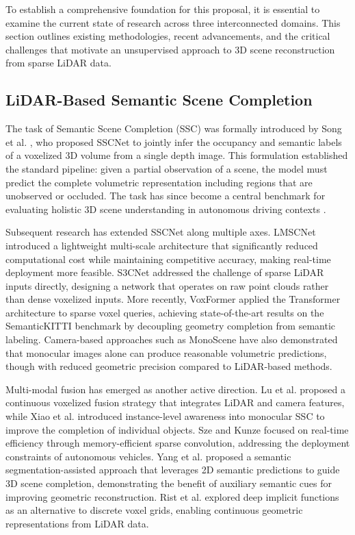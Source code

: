 \documentclass[a4paper, 12pt]{article}
\begin{document}
	To establish a comprehensive foundation for this proposal, it is essential to
	examine the current state of research across three interconnected domains. This
	section outlines existing methodologies, recent advancements, and the critical
	challenges that motivate an unsupervised approach to 3D scene reconstruction
	from sparse LiDAR data.
	
	\subsection{LiDAR-Based Semantic Scene Completion}
	
	The task of Semantic Scene Completion (SSC) was formally introduced by Song et
	al. \cite{Song_2017_CVPR}, who proposed SSCNet to jointly infer the occupancy
	and semantic labels of a voxelized 3D volume from a single depth image. This
	formulation established the standard pipeline: given a partial observation of a
	scene, the model must predict the complete volumetric representation including
	regions that are unobserved or occluded. The task has since become a central
	benchmark for evaluating holistic 3D scene understanding in autonomous driving
	contexts \cite{10469138, 10802143}.
	
	Subsequent research has extended SSCNet along multiple axes. LMSCNet
	\cite{9320442} introduced a lightweight multi-scale architecture that
	significantly reduced computational cost while maintaining competitive
	accuracy, making real-time deployment more feasible. S3CNet
	\cite{pmlr-v155-cheng21a} addressed the challenge of sparse LiDAR inputs
	directly, designing a network that operates on raw point clouds rather than
	dense voxelized inputs. More recently, VoxFormer \cite{Li_2023_CVPR} applied
	the Transformer architecture to sparse voxel queries, achieving
	state-of-the-art results on the SemanticKITTI benchmark by decoupling geometry
	completion from semantic labeling. Camera-based approaches such as MonoScene
	\cite{Cao_2022_CVPR} have also demonstrated that monocular images alone can
	produce reasonable volumetric predictions, though with reduced geometric
	precision compared to LiDAR-based methods.
	
	Multi-modal fusion has emerged as another active direction. Lu et al.
	\cite{10613892} proposed a continuous voxelized fusion strategy that
	integrates LiDAR and camera features, while Xiao et al. \cite{10379527}
	introduced instance-level awareness into monocular SSC to improve the
	completion of individual objects. Sze and Kunze \cite{10588696} focused on
	real-time efficiency through memory-efficient sparse convolution, addressing
	the deployment constraints of autonomous vehicles. Yang et al. \cite{9636662} proposed a semantic segmentation-assisted
	approach that leverages 2D semantic predictions to guide 3D scene completion,
	demonstrating the benefit of auxiliary semantic cues for improving geometric
	reconstruction. Rist et al. \cite{9477025} explored deep implicit functions
	as an alternative to discrete voxel grids, enabling continuous geometric
	representations from LiDAR data.
	
\end{document}

